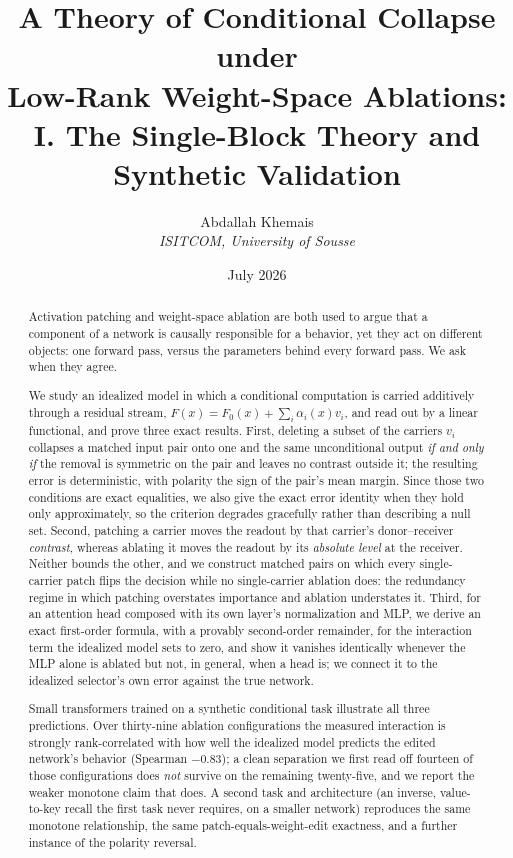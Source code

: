 \documentclass[11pt,a4paper]{article}
\begin{document}
\title{A Theory of Conditional Collapse under \\ Low-Rank Weight-Space Ablations: \\ I. The Single-Block Theory and Synthetic Validation}
\author{Abdallah Khemais \\ \textit{ISITCOM, University of Sousse}}
\date{July 2026}

\maketitle

\begin{abstract}
Activation patching and weight-space ablation are both used to argue that a
component of a network is causally responsible for a behavior, yet they act
on different objects: one forward pass, versus the parameters behind every
forward pass. We ask when they agree.

We study an idealized model in which a conditional computation is carried
additively through a residual stream, $F(x)=F_0(x)+\sum_i\alpha_i(x)v_i$, and
read out by a linear functional, and prove three exact results. First,
deleting a subset of the carriers $v_i$ collapses a matched input pair onto
one and the same unconditional output \emph{if and only if} the removal is
symmetric on the pair and leaves no contrast outside it; the resulting error
is deterministic, with polarity the sign of the pair's mean margin. Since
those two conditions are exact equalities, we also give the exact error
identity when they hold only approximately, so the criterion degrades
gracefully rather than describing a null set. Second,
patching a carrier moves the readout by that carrier's donor--receiver
\emph{contrast}, whereas ablating it moves the readout by its \emph{absolute
level} at the receiver. Neither bounds the other, and we construct matched
pairs on which every single-carrier patch flips the decision while no
single-carrier ablation does: the redundancy regime in which patching
overstates importance and ablation understates it. Third, for an attention
head composed with its own layer's normalization and MLP, we derive an exact
first-order formula, with a provably second-order remainder, for the
interaction term the idealized model sets to zero, and show it vanishes
identically whenever the MLP alone is ablated but not, in general, when a
head is; we connect it to the idealized selector's own error against the
true network.

Small transformers trained on a synthetic conditional task illustrate all
three predictions. Over thirty-nine ablation configurations the measured
interaction is strongly rank-correlated with how well the idealized model
predicts the edited network's behavior (Spearman $-0.83$); a clean
separation we first read off fourteen of those configurations does
\emph{not} survive on the remaining twenty-five, and we report the weaker
monotone claim that does. A second task and architecture (an inverse,
value-to-key recall the first task never requires, on a smaller network)
reproduces the same monotone relationship, the same patch-equals-weight-edit
exactness, and a further instance of the polarity reversal.


\end{abstract}
\end{document}
